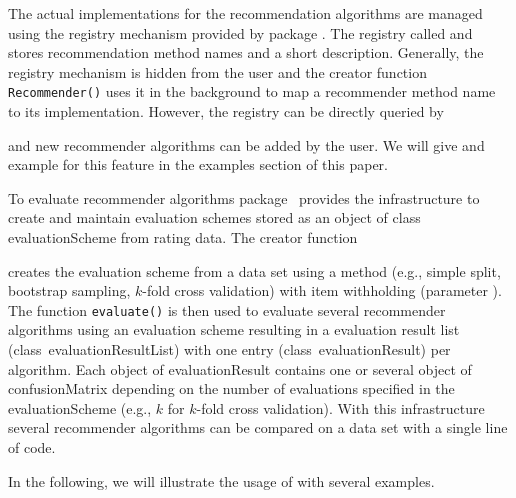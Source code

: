 \documentclass[nojss]{jss}
\newcommand{\class}[1]{\mbox{\textsf{#1}}}
\newcommand{\func}[1]{\mbox{\texttt{#1()}}}
\begin{document}
The actual implementations for the recommendation algorithms are
managed using the registry mechanism provided by package .
The registry called 
and stores recommendation method names and a short description.
Generally, the registry mechanism is hidden from the user and the
creator function \func{Recommender} uses it in the background to map
a recommender method name to its implementation. However, the
registry can be directly queried by

\begin{center}
\end{center}

and new recommender algorithms can be added by the user.
We will give and example for this feature
in the examples section of this paper.

To evaluate recommender algorithms package~
provides the infrastructure to create and maintain evaluation schemes
stored as an object of class \class{evaluationScheme} from rating data.
The creator function

\begin{center}
\end{center}

creates the evaluation scheme from a data set using a method
(e.g., simple split, bootstrap sampling, $k$-fold cross validation)
with item withholding (parameter ).
The function \func{evaluate} is then used to
evaluate several recommender algorithms using an evaluation scheme resulting
in a evaluation result list (class~\class{evaluationResultList}) with
one entry (class~\class{evaluationResult}) per algorithm.
Each object of \class{evaluationResult}
contains one or several object of \class{confusionMatrix} depending on the
number of evaluations specified in the \class{evaluationScheme} (e.g., $k$
for $k$-fold cross validation).
With this infrastructure several recommender algorithms can be compared
on a data set with a single line of code.

In the following, we will illustrate the usage of 
with several examples.
\end{document}
